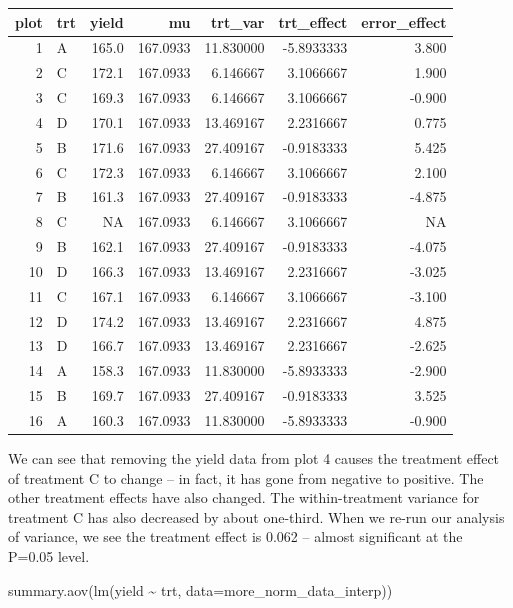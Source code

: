 \documentclass[
]{book}
\newenvironment{Shaded}{\begin{snugshade}}{\end{snugshade}}
\newcommand{\AttributeTok}[1]{\textcolor[rgb]{0.77,0.63,0.00}{#1}}
\newcommand{\FunctionTok}[1]{\textcolor[rgb]{0.00,0.00,0.00}{#1}}
\newcommand{\NormalTok}[1]{#1}
\newcommand{\SpecialCharTok}[1]{\textcolor[rgb]{0.00,0.00,0.00}{#1}}
\begin{document}
\begin{tabular}{r|l|r|r|r|r|r}
\hline
plot & trt & yield & mu & trt\_var & trt\_effect & error\_effect\\
\hline
1 & A & 165.0 & 167.0933 & 11.830000 & -5.8933333 & 3.800\\
\hline
2 & C & 172.1 & 167.0933 & 6.146667 & 3.1066667 & 1.900\\
\hline
3 & C & 169.3 & 167.0933 & 6.146667 & 3.1066667 & -0.900\\
\hline
4 & D & 170.1 & 167.0933 & 13.469167 & 2.2316667 & 0.775\\
\hline
5 & B & 171.6 & 167.0933 & 27.409167 & -0.9183333 & 5.425\\
\hline
6 & C & 172.3 & 167.0933 & 6.146667 & 3.1066667 & 2.100\\
\hline
7 & B & 161.3 & 167.0933 & 27.409167 & -0.9183333 & -4.875\\
\hline
8 & C & NA & 167.0933 & 6.146667 & 3.1066667 & NA\\
\hline
9 & B & 162.1 & 167.0933 & 27.409167 & -0.9183333 & -4.075\\
\hline
10 & D & 166.3 & 167.0933 & 13.469167 & 2.2316667 & -3.025\\
\hline
11 & C & 167.1 & 167.0933 & 6.146667 & 3.1066667 & -3.100\\
\hline
12 & D & 174.2 & 167.0933 & 13.469167 & 2.2316667 & 4.875\\
\hline
13 & D & 166.7 & 167.0933 & 13.469167 & 2.2316667 & -2.625\\
\hline
14 & A & 158.3 & 167.0933 & 11.830000 & -5.8933333 & -2.900\\
\hline
15 & B & 169.7 & 167.0933 & 27.409167 & -0.9183333 & 3.525\\
\hline
16 & A & 160.3 & 167.0933 & 11.830000 & -5.8933333 & -0.900\\
\hline
\end{tabular}

We can see that removing the yield data from plot 4 causes the treatment effect of treatment C to change -- in fact, it has gone from negative to positive. The other treatment effects have also changed. The within-treatment variance for treatment C has also decreased by about one-third. When we re-run our analysis of variance, we see the treatment effect is 0.062 -- almost significant at the P=0.05 level.

\begin{Shaded}
\begin{Highlighting}[]
\FunctionTok{summary.aov}\NormalTok{(}\FunctionTok{lm}\NormalTok{(yield }\SpecialCharTok{\textasciitilde{}}\NormalTok{ trt, }\AttributeTok{data=}\NormalTok{more\_norm\_data\_interp))}
\end{Highlighting}
\end{Shaded}
\end{document}
